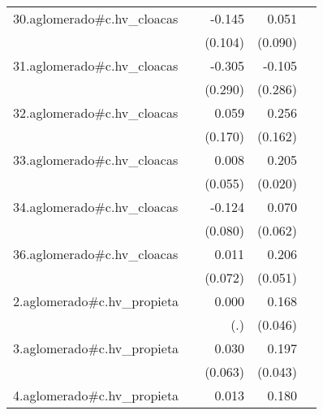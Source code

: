{\begin{longtable}{l*{4}{D{.}{.}{-1}}}
\addlinespace
30.aglomerado#c.hv\_cloacas&                     &      -0.145         &       0.051         &                     \\
            &                     &     (0.104)         &     (0.090)         &                     \\
\addlinespace
31.aglomerado#c.hv\_cloacas&                     &      -0.305         &      -0.105         &                     \\
            &                     &     (0.290)         &     (0.286)         &                     \\
\addlinespace
32.aglomerado#c.hv\_cloacas&                     &       0.059         &       0.256         &                     \\
            &                     &     (0.170)         &     (0.162)         &                     \\
\addlinespace
33.aglomerado#c.hv\_cloacas&                     &       0.008         &       0.205\sym{***}&                     \\
            &                     &     (0.055)         &     (0.020)         &                     \\
\addlinespace
34.aglomerado#c.hv\_cloacas&                     &      -0.124         &       0.070         &                     \\
            &                     &     (0.080)         &     (0.062)         &                     \\
\addlinespace
36.aglomerado#c.hv\_cloacas&                     &       0.011         &       0.206\sym{***}&                     \\
            &                     &     (0.072)         &     (0.051)         &                     \\
\addlinespace
2.aglomerado#c.hv\_propieta&                     &       0.000         &       0.168\sym{***}&                     \\
            &                     &         (.)         &     (0.046)         &                     \\
\addlinespace
3.aglomerado#c.hv\_propieta&                     &       0.030         &       0.197\sym{***}&                     \\
            &                     &     (0.063)         &     (0.043)         &                     \\
\addlinespace
4.aglomerado#c.hv\_propieta&                     &       0.013         &       0.180\sym{***}&                     \\

\end{longtable}}
